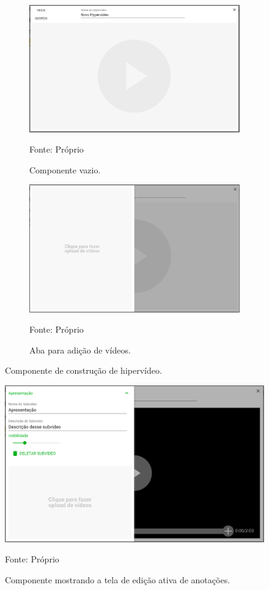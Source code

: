 \begin{figure}[h!]
	\centering
	\begin{subfigure}{.45\textwidth}
	  	\centering
  		\includegraphics[width=.9\linewidth]{figuras/composer_tab_closed.eps}
  		\caption{Componente vazio.}
		\small{Fonte: Próprio}
	  	\label{fig:hp_closed_tab}
  	\end{subfigure}%
	\begin{subfigure}{.45\textwidth}
	  	\centering
  		\includegraphics[width=.9\linewidth]{figuras/composer_tab_opened.eps}
  		\caption{Aba para adição de vídeos.}
		\small{Fonte: Próprio}
	  	\label{fig:hp_open_tab}
  	\end{subfigure}%
	\caption{Componente de construção de hipervídeo.}
\end{figure} 

\begin{figure}[h!]
	\centering
  	\includegraphics[width=.9\linewidth]{figuras/composer_video_added.eps}
  	\caption{Componente mostrando a tela de edição ativa de anotações.}
	\small{Fonte: Próprio}
  	\label{fig:hp_editing}
\end{figure} 

